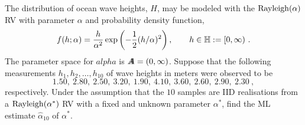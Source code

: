 \begin{labwork}\label{LW:RayleighOceanHeightsMLE}
The distribution of ocean wave heights, $H$, may be modeled with the ${\rm Rayleigh}(\alpha)$ RV with parameter $\alpha$ and probability density function,
\[
f(h;\alpha) = \frac{h}{\alpha^2} \exp \left({-\frac{1}{2} (h/\alpha)^2}\right), \qquad h \in \mathbb{H} := [0,\infty) \ .
\]
The parameter space for $alpha$ is ${A}\mspace{-11 mu}{A} = (0,\infty)$.  Suppose that the following measurements $h_1,h_2,\ldots,h_{10}$ of wave heights in meters were observed to be
\[
1.50, \  2.80, \ 2.50, \ 3.20, \ 1.90, \ 4.10, \ 3.60, \ 2.60, \ 2.90, \ 2.30 \ ,
\]
respectively.  Under the assumption that the $10$ samples are IID realisations from a ${\rm Rayleigh}(\alpha^*)$ RV with a fixed and unknown parameter $\alpha^*$, find the ML estimate $\widehat{\alpha}_{10}$ of $\alpha^*$.


\end{labwork}
